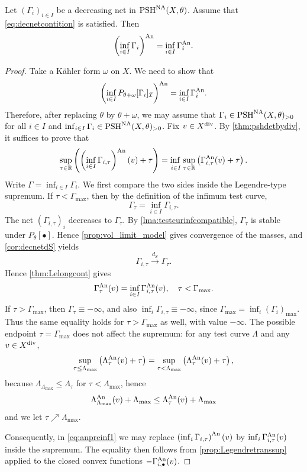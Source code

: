 \begin{proposition}\label{prop:anpreinf}
    Let $(\Gamma_i)_{i\in I}$ be a decreasing net in $\mathrm{PSH}^{\mathrm{NA}}(X,\theta)$. Assume that \eqref{eq:decnetcontition} is satisfied. Then
    \[
        \left( \inf_{i\in I} \Gamma_{i} \right)^{\mathrm{An}}=\inf_{i\in I} \Gamma_{i}^{\mathrm{An}}.
    \]
\end{proposition}
\begin{proof}
    Take a K\"ahler form $\omega$ on $X$. We need to show that
    \[
    \left( \inf_{i\in I} P_{\theta+\omega}[\Gamma_i]_{\mathcal{I}} \right)^{\mathrm{An}}=\inf_{i\in I} \Gamma_{i}^{\mathrm{An}}.
    \]
    Therefore, after replacing $\theta$ by $\theta+\omega$, we may assume that $\Gamma_i\in \mathrm{PSH}^{\mathrm{NA}}(X,\theta)_{>0}$ for all $i\in I$ and $\inf_{i\in I}\Gamma_i\in \mathrm{PSH}^{\mathrm{NA}}(X,\theta)_{>0}$.
    Fix $v\in X^{\operatorname{div}}$. By \cref{thm:pshdetbydiv}, it suffices to prove that
    \begin{equation}\label{eq:anpreinf1}
        \sup_{\tau\in \mathbb{R}} \left( \left(\inf_{i\in I}\Gamma_{i,\tau}\right)^{\An}(v)+\tau \right)= \adjustlimits\inf_{i\in I}\sup_{\tau\in \mathbb{R}} \left( \Gamma_{i,\tau}^{\An}(v)+\tau \right).
    \end{equation}
    Write $\Gamma=\inf_{i\in I}\Gamma_i$. We first compare the two sides inside the Legendre-type supremum. If $\tau<\Gamma_{\max}$, then by the definition of the infimum test curve,
    \[
        \Gamma_{\tau}=\inf_{i\in I}\Gamma_{i,\tau}.
    \]
    The net $(\Gamma_{i,\tau})_i$ decreases to $\Gamma_{\tau}$. By \cref{lma:testcurinfcompatible}, $\Gamma_{\tau}$ is stable under $P_{\theta}[\bullet]$.
    Hence \cref{prop:vol_limit_model} gives convergence of the masses, and \cref{cor:decnetdS} yields
    \[
        \Gamma_{i,\tau}\xrightarrow{d_S}\Gamma_{\tau}.
    \]
    Hence \cref{thm:Lelongcont} gives
    \[
        \Gamma_{\tau}^{\mathrm{An}}(v)=\inf_{i\in I}\Gamma_{i,\tau}^{\mathrm{An}}(v),\quad \tau<\Gamma_{\max}.
    \]
    If $\tau>\Gamma_{\max}$, then $\Gamma_{\tau}\equiv-\infty$, and also $\inf_i\Gamma_{i,\tau}\equiv-\infty$, since $\Gamma_{\max}=\inf_i(\Gamma_i)_{\max}$. Thus the same equality holds for $\tau>\Gamma_{\max}$ as well, with value $-\infty$. The possible endpoint $\tau=\Gamma_{\max}$ does not affect the supremum: for any test curve $\Lambda$ and any $v\in X^{\operatorname{div}}$,
    \[
        \sup_{\tau\leq \Lambda_{\max}}\left(\Lambda_{\tau}^{\mathrm{An}}(v)+\tau\right)
        =\sup_{\tau< \Lambda_{\max}}\left(\Lambda_{\tau}^{\mathrm{An}}(v)+\tau\right),
    \]
    because $\Lambda_{\Lambda_{\max}}\leq \Lambda_{\tau}$ for $\tau<\Lambda_{\max}$, hence
    \[
        \Lambda_{\Lambda_{\max}}^{\mathrm{An}}(v)+\Lambda_{\max}
        \leq \Lambda_{\tau}^{\mathrm{An}}(v)+\Lambda_{\max}
    \]
    and we let $\tau\nearrow \Lambda_{\max}$.

    Consequently, in \eqref{eq:anpreinf1} we may replace $\left(\inf_i\Gamma_{i,\tau}\right)^{\mathrm{An}}(v)$ by $\inf_i\Gamma_{i,\tau}^{\mathrm{An}}(v)$ inside the supremum. The equality then follows from \cref{prop:Legendretranssup} applied to the closed convex functions $-\Gamma_{i,\bullet}^{\mathrm{An}}(v)$.
\end{proof}

